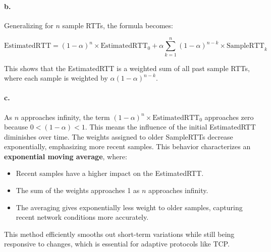 \documentclass{cshwk}
\begin{document}
\paragraph{b.} Generalizing for \( n \) sample RTTs, the formula becomes:

\[
    \text{EstimatedRTT} = (1 - \alpha)^n \times \text{EstimatedRTT}_0 + \alpha \sum_{k=1}^{n} (1 - \alpha)^{n - k} \times \text{SampleRTT}_k
\]

This shows that the EstimatedRTT is a weighted sum of all past sample RTTs, where each sample is weighted by \(\alpha (1 - \alpha)^{n - k}\).

\paragraph{c.} As \( n \) approaches infinity, the term \((1 - \alpha)^n \times \text{EstimatedRTT}_0\) approaches zero because \(0 < (1 - \alpha) < 1\). This means the influence of the initial EstimatedRTT diminishes over time. The weights assigned to older SampleRTTs decrease exponentially, emphasizing more recent samples. This behavior characterizes an \textbf{exponential moving average}, where:

\begin{itemize}
    \item Recent samples have a higher impact on the EstimatedRTT.
    \item The sum of the weights approaches 1 as \( n \) approaches infinity.
    \item The averaging gives exponentially less weight to older samples, capturing recent network conditions more accurately.
\end{itemize}

This method efficiently smooths out short-term variations while still being responsive to changes, which is essential for adaptive protocols like TCP.
\end{document}
